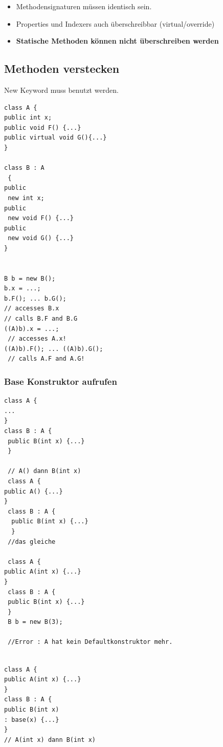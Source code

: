 \documentclass[a4paper,10pt]{scrartcl}
\begin{document}
\begin{itemize}
 \item Methodensignaturen müssen identisch sein.
 \item Properties und Indexers auch überschreibbar (virtual/override)
 \item \textbf{Statische  Methoden können nicht überschreiben werden}
\end{itemize}

\subsection{Methoden verstecken}
New Keyword muss benutzt werden.
\begin{lstlisting}[caption=Versteckung Beispiel]
class A {
public int x;
public void F() {...}
public virtual void G(){...}
}

class B : A
 {
public
 new int x;
public
 new void F() {...}
public
 new void G() {...}
}


B b = new B();
b.x = ...;
b.F(); ... b.G();
// accesses B.x
// calls B.F and B.G
((A)b).x = ...;
 // accesses A.x!
((A)b).F(); ... ((A)b).G();
 // calls A.F and A.G!

\end{lstlisting}

\subsubsection{Base Konstruktor aufrufen}
\begin{lstlisting}[caption=Basiskonstruktor implizit aufrufen]
 class A {
...
}
class B : A {
 public B(int x) {...}
 }
 
 // A() dann B(int x)
 class A {
public A() {...}
}
 class B : A {
  public B(int x) {...}
  }
 //das gleiche
 
 class A {
public A(int x) {...}
}
 class B : A {
 public B(int x) {...}
 }
 B b = new B(3);

 //Error : A hat kein Defaultkonstruktor mehr.
 
\end{lstlisting}

\begin{lstlisting}[caption=Basiskonstruktor explizit aufrufen]
 class A {
public A(int x) {...}
}
class B : A {
public B(int x)
: base(x) {...}
}
// A(int x) dann B(int x)
\end{lstlisting}
\end{document}
